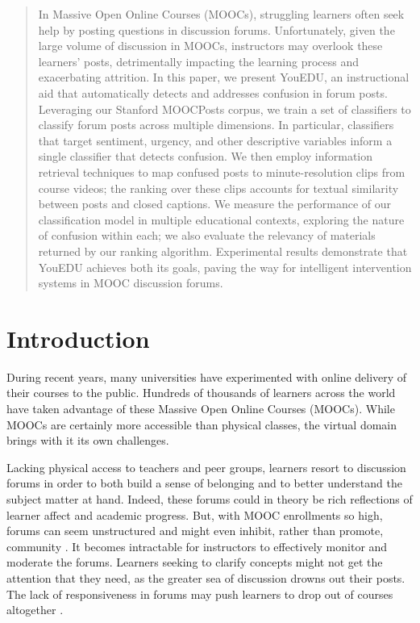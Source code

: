 \documentclass{edm_template}
\begin{document}
\maketitle
\begin{abstract}
In Massive Open Online Courses (MOOCs), struggling learners often seek help by
posting questions in discussion forums. Unfortunately, given the large volume of discussion in MOOCs, instructors may overlook these learners' posts,
detrimentally impacting the learning process and exacerbating attrition. In this paper, we present YouEDU, an instructional aid that automatically detects and addresses confusion in forum posts. Leveraging our Stanford MOOCPosts corpus, we train a set of classifiers to classify forum posts across multiple dimensions. In particular, classifiers that target sentiment, urgency, and other descriptive variables inform a single classifier that detects confusion. We then employ information retrieval techniques to map confused posts to minute-resolution clips from course videos; the ranking over these clips accounts for textual similarity between posts and closed captions. We measure the performance of our classification model in multiple educational contexts, exploring the nature of confusion within each; we also evaluate the relevancy of materials returned by our ranking algorithm. Experimental results demonstrate that YouEDU achieves both its goals, paving the way for intelligent intervention systems in MOOC discussion forums.
\end{abstract}

%

\section{Introduction}
\label{sec:intro}

During recent years, many universities have experimented with online delivery of their courses to the public. Hundreds of thousands of learners across the world have taken advantage of these Massive Open Online Courses (MOOCs). While MOOCs are certainly more accessible than physical classes, the virtual domain brings with it its own challenges.

Lacking physical access to teachers and peer groups, learners resort to discussion forums in order to both build a sense of belonging and to better understand the subject matter at hand. Indeed, these forums could in theory be rich reflections of learner affect and academic progress. But, with MOOC enrollments so high, forums can seem unstructured and might even inhibit, rather than promote, community \cite{community}. It becomes intractable for instructors to effectively monitor and moderate the forums. Learners seeking to clarify concepts might not get the attention that they need, as the greater sea of discussion drowns out their posts. The lack of responsiveness in forums may push learners to drop out of courses altogether \cite{wen2015confusion}.
\end{document}
